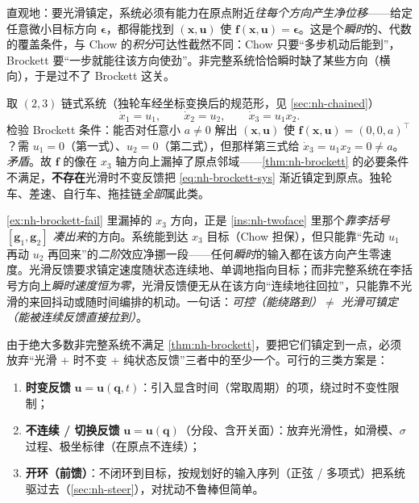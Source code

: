 \begin{remark}\label{rem:nh-brockett-meaning}
直观地：要光滑镇定，系统必须有能力在原点附近\emph{往每个方向产生净位移}——给定任意微小目标方向 $\boldsymbol{\epsilon}$，都得能找到 $(\mathbf{x},\mathbf{u})$ 使 $\mathbf{f}(\mathbf{x},\mathbf{u})=\boldsymbol{\epsilon}$。这是个\emph{瞬时}的、代数的覆盖条件，与 Chow 的\emph{积分}可达性截然不同：Chow 只要“多步机动后能到”，Brockett 要“一步就能往该方向使劲”。非完整系统恰恰瞬时缺了某些方向（横向），于是过不了 Brockett 这关。
\end{remark}

\begin{example}\label{ex:nh-brockett-fail}
取 $(2,3)$ 链式系统（独轮车经坐标变换后的规范形，见 \cref{sec:nh-chained}）
\begin{equation}
  \dot x_1=u_1,\qquad \dot x_2=u_2,\qquad \dot x_3=u_1 x_2 .
  \label{eq:nh-brockett-sys}
\end{equation}
检验 Brockett 条件：能否对任意小 $a\neq0$ 解出 $(\mathbf{x},\mathbf{u})$ 使 $\mathbf{f}(\mathbf{x},\mathbf{u})=(0,0,a)^\top$？需 $u_1=0$（第一式）、$u_2=0$（第二式），但那样第三式给 $\dot x_3=u_1 x_2=0\neq a$。\emph{矛盾}。故 $\mathbf{f}$ 的像在 $x_3$ 轴方向上漏掉了原点邻域——\cref{thm:nh-brockett} 的必要条件不满足，\textbf{不存在}光滑时不变反馈把 \cref{eq:nh-brockett-sys} 渐近镇定到原点。独轮车、差速、自行车、拖挂链\emph{全部}属此类。
\end{example}

\begin{insight}\label{ins:nh-brockett-geo}
\cref{ex:nh-brockett-fail} 里漏掉的 $x_3$ 方向，正是 \cref{ins:nh-twoface} 里那个\emph{靠李括号 $[\mathbf{g}_1,\mathbf{g}_2]$ 凑出来}的方向。系统能到达 $x_3$ 目标（Chow 担保），但只能靠“先动 $u_1$ 再动 $u_2$ 再回来”的\emph{二阶}效应净挪一段——任何\emph{瞬时}的输入都在该方向产生零速度。光滑反馈要求镇定速度随状态连续地、单调地指向目标；而非完整系统在李括号方向上\emph{瞬时速度恒为零}，光滑反馈便无从在该方向“连续地往回拉”，只能靠不光滑的来回抖动或随时间编排的机动。一句话：\emph{可控（能绕路到）$\neq$ 光滑可镇定（能被连续反馈直接拉到）}。
\end{insight}

\begin{theorem}\label{thm:nh-three-ways}
由于绝大多数非完整系统不满足 \cref{thm:nh-brockett}，要把它们镇定到一点，必须放弃“光滑 + 时不变 + 纯状态反馈”三者中的至少一个。可行的三类方案是：
\begin{enumerate}
  \item \textbf{时变反馈} $\mathbf{u}=\mathbf{u}(\mathbf{q},t)$：引入显含时间（常取周期）的项，绕过时不变性限制；
  \item \textbf{不连续 / 切换反馈} $\mathbf{u}=\mathbf{u}(\mathbf{q})$（分段、含开关面）：放弃光滑性，如滑模、$\sigma$ 过程、极坐标律（在原点不连续）；
  \item \textbf{开环（前馈）}：不闭环到目标，按规划好的输入序列（正弦 / 多项式）把系统驱过去（\cref{sec:nh-steer}），对扰动不鲁棒但简单。
\end{enumerate}
\end{theorem}

